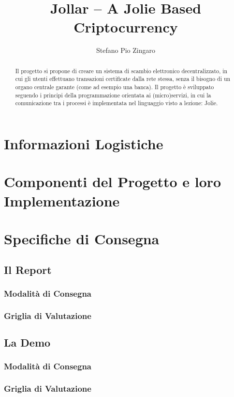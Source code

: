 \documentclass[12pt,a4paper,draft]{article}
\title{Jollar -- A Jolie Based Criptocurrency}
\author{Stefano Pio Zingaro}
\begin{document}
\maketitle

\begin{abstract}
Il progetto si propone di creare un sistema di scambio elettronico decentralizzato, in cui gli utenti effettuano transazioni certificate dalla rete stessa, senza il bisogno di un organo centrale garante (come ad esempio una banca). Il progetto è sviluppato seguendo i principi della programmazione orientata ai (micro)servizi, in cui la comunicazione tra i processi è implementata nel linguaggio visto a lezione: Jolie.
\end{abstract}

\tableofcontents

\section{Informazioni Logistiche}


\section{Componenti del Progetto e loro Implementazione}


\section{Specifiche di Consegna}
%
\subsection{Il Report}
%
\subsubsection{Modalità di Consegna}
%
\subsubsection{Griglia di Valutazione}
%
\subsection{La Demo}
%
\subsubsection{Modalità di Consegna}
%
\subsubsection{Griglia di Valutazione}
%
\end{document}
